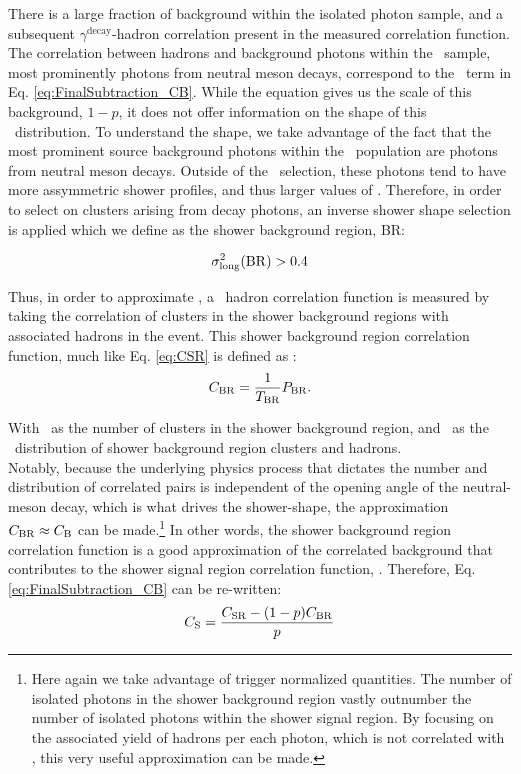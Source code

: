 There is a large fraction of \ydecay background within the isolated photon sample, and a subsequent $\gamma^\mathrm{decay}$-hadron correlation present in the measured correlation function. The correlation between hadrons and background photons within the \gammaiso~sample, most prominently photons from neutral meson decays, correspond to the \CB~term in Eq. \ref{eq:FinalSubtraction_CB}. While the equation gives us the scale of this background, $1-p$, it does not offer information on the shape of this \deltaphi~distribution. To understand the shape, we take advantage of the fact that the most prominent source background photons within the \gammaiso~population are photons from neutral meson decays. Outside of the \gammaiso~selection, these photons tend to have more assymmetric shower profiles, and thus larger values of \lambdasquare. Therefore, in order to select on clusters arising from decay photons, an inverse shower shape selection is applied which we define as the shower background region, BR:

\begin{equation}
	\label{eq:BR}
	\sigma^{2}_{\mathrm{long}}(\mathrm{BR}) > 0.4
\end{equation}

Thus, in order to approximate \CB, a \ydecay~hadron correlation function is measured by taking the correlation of clusters in the shower background regions with associated hadrons in the event. This shower background region correlation function, much like Eq. \ref{eq:CSR} is defined as \CBR:
\begin{equation}
C_{\mathrm{BR}} = \frac{1}{T_{\mathrm{BR}}}P_{\mathrm{BR}}.
\end{equation}

With \TBR~as the number of clusters in the shower background region, and \PBR~as the \deltaphi~distribution of shower background region clusters and hadrons.\\

Notably, because the underlying physics process that dictates the number and distribution of correlated pairs is independent of the opening angle of the neutral-meson decay, which is what drives the shower-shape, the approximation $C_{\mathrm{BR}} \approx C_{\mathrm{B}}$ can be made.\footnote{Here again we take advantage of trigger normalized quantities. The number of isolated photons in the shower background region vastly outnumber the number of isolated photons within the shower signal region. By focusing on the associated yield of hadrons per each photon, which is not correlated with \lambdasquare, this very useful approximation can be made.} In other words, the shower background region correlation function is a good approximation of the correlated background that contributes to the shower signal region correlation function, \CSR. Therefore, Eq. \ref{eq:FinalSubtraction_CB} can be re-written:
\begin{equation}
C_{\mathrm{S}} = \frac{C_{\mathrm{SR}} - (1-p) C_{\mathrm{BR}}}{p}
\label{eq:FinalSubtraction}
\end{equation}

